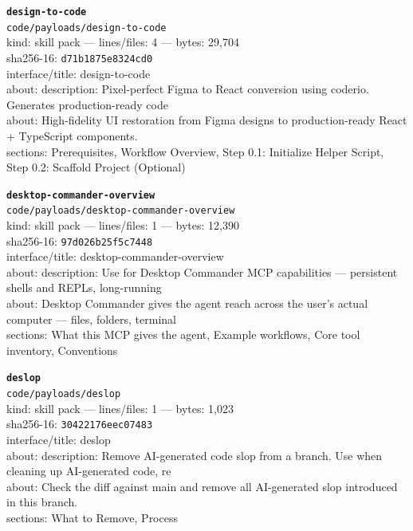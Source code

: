\noindent\textbf{\texttt{design-to-code}}\\
\texttt{code/payloads/design-to-code}\\
kind: skill pack --- lines/files: 4 --- bytes: 29,704\\
sha256-16: \texttt{d71b1875e8324cd0}\\
interface/title: design-to-code\\
about: description: Pixel-perfect Figma to React conversion using coderio. Generates production-ready code \\
about: High-fidelity UI restoration from Figma designs to production-ready React + TypeScript components.\\
sections: Prerequisites, Workflow Overview, Step 0.1: Initialize Helper Script, Step 0.2: Scaffold Project (Optional)\\
\vspace*{6.0pt}

\noindent\textbf{\texttt{desktop-commander-overview}}\\
\texttt{code/payloads/desktop-commander-overview}\\
kind: skill pack --- lines/files: 1 --- bytes: 12,390\\
sha256-16: \texttt{97d026b25f5c7448}\\
interface/title: desktop-commander-overview\\
about: description: Use for Desktop Commander MCP capabilities — persistent shells and REPLs, long-running \\
about: Desktop Commander gives the agent reach across the user's actual computer — files, folders, terminal\\
sections: What this MCP gives the agent, Example workflows, Core tool inventory, Conventions\\
\vspace*{6.0pt}

\noindent\textbf{\texttt{deslop}}\\
\texttt{code/payloads/deslop}\\
kind: skill pack --- lines/files: 1 --- bytes: 1,023\\
sha256-16: \texttt{30422176eec07483}\\
interface/title: deslop\\
about: description: Remove AI-generated code slop from a branch. Use when cleaning up AI-generated code, re\\
about: Check the diff against main and remove all AI-generated slop introduced in this branch.\\
sections: What to Remove, Process\\
\vspace*{6.0pt}

